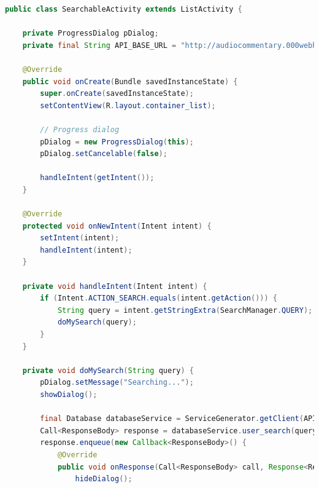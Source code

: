 \documentclass{article}
\begin{document}
\begin{landscape}
\begin{lstlisting}[language=Java, basicstyle=\tiny]
public class SearchableActivity extends ListActivity {

    private ProgressDialog pDialog;
    private final String API_BASE_URL = "http://audiocommentary.000webhostapp.com";

    @Override
    public void onCreate(Bundle savedInstanceState) {
        super.onCreate(savedInstanceState);
        setContentView(R.layout.container_list);

        // Progress dialog
        pDialog = new ProgressDialog(this);
        pDialog.setCancelable(false);

        handleIntent(getIntent());
    }

    @Override
    protected void onNewIntent(Intent intent) {
        setIntent(intent);
        handleIntent(intent);
    }

    private void handleIntent(Intent intent) {
        if (Intent.ACTION_SEARCH.equals(intent.getAction())) {
            String query = intent.getStringExtra(SearchManager.QUERY);
            doMySearch(query);
        }
    }

    private void doMySearch(String query) {
        pDialog.setMessage("Searching...");
        showDialog();

        final Database databaseService = ServiceGenerator.getClient(API_BASE_URL).create(Database.class);
        Call<ResponseBody> response = databaseService.user_search(query);
        response.enqueue(new Callback<ResponseBody>() {
            @Override
            public void onResponse(Call<ResponseBody> call, Response<ResponseBody> response) {
                hideDialog();


\end{lstlisting}
\end{landscape}
\end{document}
